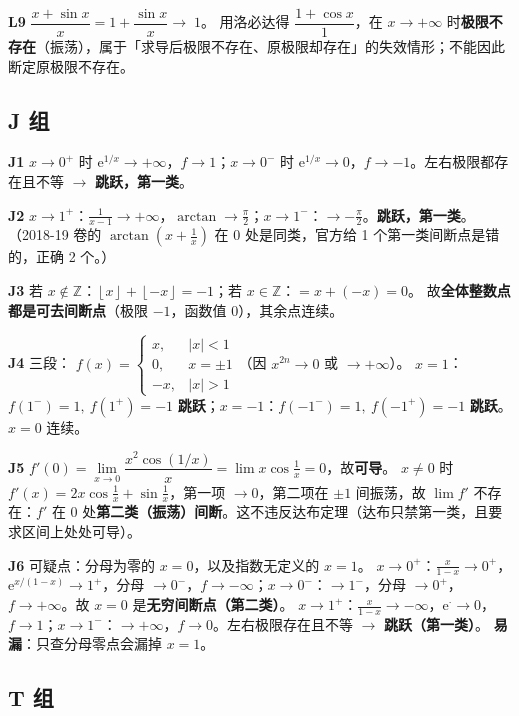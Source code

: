 \documentclass[11pt,a4paper]{ctexart}
\newcommand{\abs}[1]{\left\lvert #1\right\rvert}
\newcommand{\ee}{\mathrm{e}}
\newcommand{\floor}[1]{\left\lfloor #1\right\rfloor}
\newcommand{\ans}[1]{\;\boxed{#1}}
\begin{document}
\textbf{L9} $\dfrac{x+\sin x}{x}=1+\dfrac{\sin x}{x}\to\ans{1}$。
用洛必达得 $\dfrac{1+\cos x}{1}$，在 $x\to+\infty$ 时\textbf{极限不存在}（振荡），属于「求导后极限不存在、原极限却存在」的失效情形；不能因此断定原极限不存在。

\subsection{J 组}

\textbf{J1} $x\to0^+$ 时 $\ee^{1/x}\to+\infty$，$f\to1$；$x\to0^-$ 时 $\ee^{1/x}\to0$，$f\to-1$。左右极限都存在且不等 $\to$ \textbf{跳跃，第一类}。

\textbf{J2} $x\to1^+$：$\frac1{x-1}\to+\infty$，$\arctan\to\frac\pi2$；$x\to1^-$：$\to-\frac\pi2$。\textbf{跳跃，第一类}。（2018-19 卷的 $\arctan(x+\frac1x)$ 在 $0$ 处是同类，官方给 1 个第一类间断点是错的，正确 2 个。）

\textbf{J3} 若 $x\notin\mathbb{Z}$：$\floor{x}+\floor{-x}=-1$；若 $x\in\mathbb{Z}$：$=x+(-x)=0$。
故\textbf{全体整数点都是可去间断点}（极限 $-1$，函数值 $0$），其余点连续。

\textbf{J4} 三段：
$f(x)=\begin{cases}x,&\abs x<1\\ 0,&x=\pm1\\ -x,&\abs x>1\end{cases}$（因 $x^{2n}\to0$ 或 $\to+\infty$）。
$x=1$：$f(1^-)=1,\ f(1^+)=-1$ \textbf{跳跃}；$x=-1$：$f(-1^-)=1,\ f(-1^+)=-1$ \textbf{跳跃}。$x=0$ 连续。

\textbf{J5} $f'(0)=\lim\limits_{x\to0}\dfrac{x^2\cos(1/x)}x=\lim x\cos\frac1x=0$，故\textbf{可导}。
$x\ne0$ 时 $f'(x)=2x\cos\frac1x+\sin\frac1x$，第一项 $\to0$，第二项在 $\pm1$ 间振荡，故 $\lim f'$ 不存在：$f'$ 在 $0$ 处\textbf{第二类（振荡）间断}。这不违反达布定理（达布只禁第一类，且要求区间上处处可导）。

\textbf{J6} 可疑点：分母为零的 $x=0$，以及指数无定义的 $x=1$。
$x\to0^+$：$\frac{x}{1-x}\to0^+$，$\ee^{x/(1-x)}\to1^+$，分母 $\to0^-$，$f\to-\infty$；$x\to0^-$：$\to1^-$，分母 $\to0^+$，$f\to+\infty$。故 $x=0$ 是\textbf{无穷间断点（第二类）}。
$x\to1^+$：$\frac{x}{1-x}\to-\infty$，$\ee^{\cdot}\to0$，$f\to1$；$x\to1^-$：$\to+\infty$，$f\to0$。左右极限存在且不等 $\to$ \textbf{跳跃（第一类）}。
\textbf{易漏}：只查分母零点会漏掉 $x=1$。

\subsection{T 组}
\end{document}
